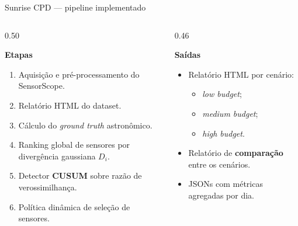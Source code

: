 \documentclass[aspectratio=169, 11pt]{beamer}
\begin{document}
\begin{frame}{Sunrise CPD --- pipeline implementado}

\begin{columns}[T]
\begin{column}{0.50\textwidth}

\textbf{Etapas}
\begin{enumerate}
  \item Aquisição e pré-processamento do SensorScope.
  \item Relatório HTML do dataset.
  \item Cálculo do \emph{ground truth} astronômico.
  \item Ranking global de sensores por divergência gaussiana $D_i$.
  \item Detector \textbf{CUSUM} sobre razão de verossimilhança.
  \item Política dinâmica de seleção de sensores.
\end{enumerate}

\end{column}
\begin{column}{0.46\textwidth}

\textbf{Saídas}
\begin{itemize}
  \item Relatório HTML por cenário:
    \begin{itemize}
      \item \textit{low budget};
      \item \textit{medium budget};
      \item \textit{high budget}.
    \end{itemize}
  \item Relatório de \textbf{comparação} entre os cenários.
  \item JSONs com métricas agregadas por dia.
\end{itemize}

\end{column}
\end{columns}

\end{frame}
\end{document}
